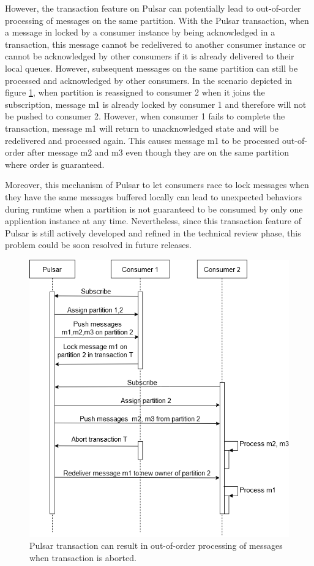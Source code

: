 However, the transaction feature on Pulsar can potentially lead to out-of-order processing of messages on the same partition. With the Pulsar transaction, when a message in locked by a consumer instance by being acknowledged in a transaction, this message cannot be redelivered to another consumer instance or cannot be acknowledged by other consumers if it is already delivered to their local queues. However, subsequent messages on the same partition can still be processed and acknowledged by other consumers. In the scenario depicted in figure \ref{fig:pulsaroutofordertransaction}, when partition is reassigned to consumer 2 when it joins the subscription, message m1 is already locked by consumer 1 and therefore will not be pushed to consumer 2. However, when consumer 1 fails to complete the transaction, message m1 will return to unacknowledged state and will be redelivered and processed again. This causes message m1 to be processed out-of-order after message m2 and m3 even though they are on the same partition where order is guaranteed.

Moreover, this mechanism of Pulsar to let consumers race to lock messages when they have the same messages buffered locally can lead to unexpected behaviors during runtime when a partition is not guaranteed to be consumed by only one application instance at any time. Nevertheless, since this transaction feature of Pulsar is still actively developed and refined in the technical review phase, this problem could be soon resolved in future releases. 

\newpage
\begin{figure}[h]
	\centering
	\includegraphics[width=12cm]{images/pulsar-transaction-out-of-order.png}
	\caption{Pulsar transaction can result in out-of-order processing of messages when transaction is aborted.}
	\label{fig:pulsaroutofordertransaction}
\end{figure}

